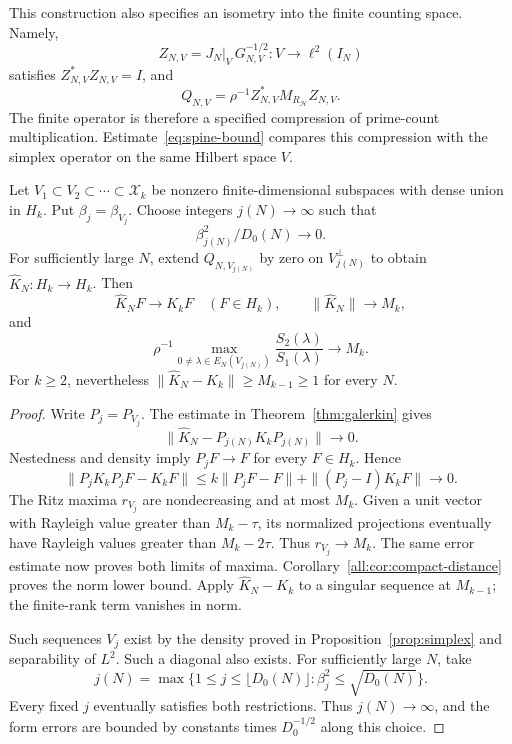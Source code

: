 \documentclass[11pt]{article}
\begin{document}
This construction also specifies an isometry into the finite counting
space.  Namely,
\[
 Z_{N,V}=J_N|_V\,G_{N,V}^{-1/2}:V\longrightarrow\ell^2(I_N)
\]
satisfies $Z_{N,V}^*Z_{N,V}=I$, and
\[
 Q_{N,V}=\rho^{-1}Z_{N,V}^*M_{R_{\mathcal H}}Z_{N,V}.
\]
The finite operator is therefore a specified compression of prime-count
multiplication.  Estimate~\eqref{eq:spine-bound} compares this compression
with the simplex operator on the same Hilbert space $V$.

\begin{corollary}\label{cor:diagonal}
Let $V_1\subset V_2\subset\cdots\subset\mathcal X_k$ be nonzero
finite-dimensional subspaces with dense union in $H_k$.
Put $\beta_j=\beta_{V_j}$.  Choose integers $j(N)\to\infty$ such that
\[
                    \beta_{j(N)}^2/D_0(N)\longrightarrow0.
\]
For sufficiently large $N$, extend $Q_{N,V_{j(N)}}$ by zero on
$V_{j(N)}^\perp$ to obtain $\widehat K_N:H_k\to H_k$.
Then
\[
 \widehat K_NF\longrightarrow K_kF\quad(F\in H_k),\qquad
 \|\widehat K_N\|\longrightarrow M_k,
\]
and
\[
 \rho^{-1}\max_{0\ne\lambda\in E_N(V_{j(N)})}
              \frac{S_2(\lambda)}{S_1(\lambda)}\longrightarrow M_k.
\]
For $k\geq2$, nevertheless
$\|\widehat K_N-K_k\|\geq M_{k-1}\geq1$ for every $N$.
\end{corollary}

\begin{proof}
Write $P_j=P_{V_j}$.  The estimate in Theorem~\ref{thm:galerkin} gives
\[
                 \|\widehat K_N-P_{j(N)}K_kP_{j(N)}\|\longrightarrow0.
\]
Nestedness and density imply $P_jF\to F$ for every $F\in H_k$.
Hence
\[
 \|P_jK_kP_jF-K_kF\|
 \leq k\|P_jF-F\|+\|(P_j-I)K_kF\|\longrightarrow0.
\]
The Ritz maxima $r_{V_j}$ are nondecreasing and at most $M_k$.
Given a unit vector with Rayleigh value greater than $M_k-\tau$,
its normalized projections eventually have Rayleigh values greater than
$M_k-2\tau$.  Thus $r_{V_j}\to M_k$.
The same error estimate now proves both limits of maxima.
Corollary~\ref{all:cor:compact-distance} proves the norm lower bound.
Apply $\widehat K_N-K_k$ to a singular sequence at $M_{k-1}$;
the finite-rank term vanishes in norm.

Such sequences $V_j$ exist by the density proved in
Proposition~\ref{prop:simplex} and separability of $L^2$.
Such a diagonal also exists.  For sufficiently large $N$, take
\[
 j(N)=\max\{1\leq j\leq\lfloor D_0(N)\rfloor:
                          \beta_j^2\leq\sqrt{D_0(N)}\}.
\]
Every fixed $j$ eventually satisfies both restrictions.
Thus $j(N)\to\infty$, and the form errors are bounded by constants
times $D_0^{-1/2}$ along this choice.
\end{proof}
\end{document}
